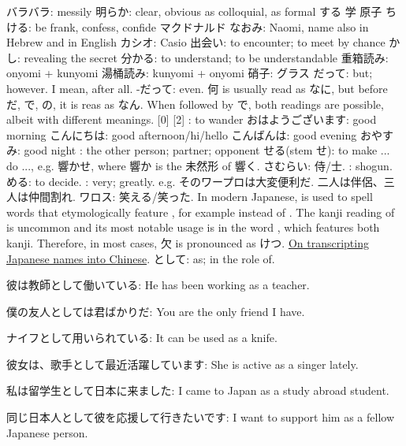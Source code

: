 \documentclass[hidelinks]{ctexart}
\begin{document}
\newpoint{}
\newpoint{}
\newpoint{}バラバラ: messily
\newpoint{}明らか: clear, obvious
\newpoint{} as colloquial,  as formal
\newpoint{}
\newpoint{}
\newpoint{}する
\newpoint{}学
\newpoint{}原子
\newpoint{}ちける: be frank, confess, confide
\newpoint{}マクドナルド
\newpoint{}なおみ: Naomi, name also in Hebrew and in English
\newpoint{}カシオ: Casio
\newpoint{}出会い: to encounter; to meet by chance
\newpoint{}かし: revealing the secret
\newpoint{}分かる: to understand; to be understandable
\newpoint{}重箱読み: onyomi + kunyomi
\newpoint{}湯桶読み: kunyomi + onyomi
\newpoint{}硝子: グラス
\newpoint{}だって: but; however. I mean, after all.
\newpoint{}-だって: even.
\newpoint{}何 is usually read as なに, but before だ, で, の, it is reas as なん. When followed by で, both readings are possible, albeit with different meanings.
\newpoint{}
\newpoint{}
\newpoint{}[0]
\newpoint{}[2]
\newpoint{}: to wander
\newpoint{}おはようございます: good morning
\newpoint{}こんにちは: good afternoon/hi/hello
\newpoint{}こんばんは: good evening
\newpoint{}おやすみ: good night
\newpoint{}: the other person; partner; opponent
\newpoint{}せる(stem せ): to make ... do ..., e.g. 響かせ, where 響か is the 未然形 of 響く.
\newpoint{}さむらい: 侍/士.
\newpoint{}: shogun.
\newpoint{}める: to decide.
\newpoint{}: very; greatly. e.g. そのワープロは大変便利だ.
\newpoint{}二人は伴侶、三人は仲間割れ.
\newpoint{}ワロス: 笑える/笑った.
\newpoint{}In modern Japanese,  is used to spell words that etymologically feature , for example  instead of . The kanji reading of  is uncommon and its most notable usage is in the word , which features both kanji. Therefore, in most cases, 欠 is pronounced as けつ.
\newpoint{}\href{https://www.zhihu.com/question/33571461/answer/69189684}{On transcripting Japanese names into Chinese}.
\newpoint{}として: as; in the role of.
\begin{citemize}
    \item 彼は教師として働いている: He has been working as a teacher.
    \item 僕の友人としては君ばかりだ: You are the only friend I have.
    \item ナイフとして用いられている: It can be used as a knife.
    \item 彼女は、歌手として最近活躍しています: She is active as a singer lately.
    \item 私は留学生として日本に来ました: I came to Japan as a study abroad student.
    \item 同じ日本人として彼を応援して行きたいです: I want to support him as a fellow Japanese person.
\end{citemize}
\end{document}
